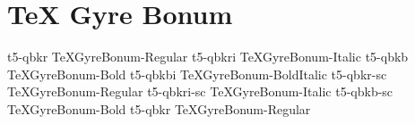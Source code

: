 \documentclass[sample]{vnsample}
\begin{document}
\section{TeX Gyre Bonum}
    {t5-qbkr}     {TeXGyreBonum-Regular}
   {t5-qbkri}    {TeXGyreBonum-Italic}
    {t5-qbkb}     {TeXGyreBonum-Bold}
   {t5-qbkbi}    {TeXGyreBonum-BoldItalic}
   {t5-qbkr-sc}  {TeXGyreBonum-Regular}
 {t5-qbkri-sc} {TeXGyreBonum-Italic}
   {t5-qbkb-sc}  {TeXGyreBonum-Bold}
    {t5-qbkr}     {TeXGyreBonum-Regular}
\end{document}
